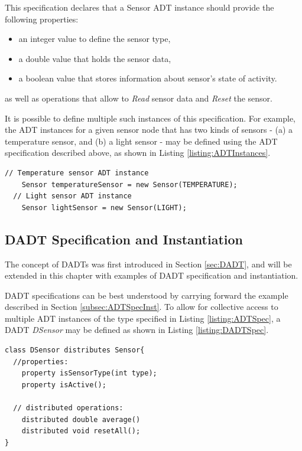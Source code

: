 This specification declares that a Sensor ADT instance should provide the following properties:
\begin{itemize}
\item an integer value to define the sensor type,
\item a double value that holds the sensor data, 
\item a boolean value that stores information about sensor's state of activity.
\end{itemize}
as well as operations that allow to \emph{Read} sensor data and \emph{Reset}
the sensor.

It is possible to define multiple such instances of this specification. For
example, the ADT instances for a given sensor node that has two kinds of sensors
- (a) a temperature sensor, and (b) a light sensor - may be defined using the ADT
specification described above, as shown in Listing \ref{listing:ADTInstances}. 
\begin{lstlisting}[frame=trbl, basewidth={0.55em, 0.6em}, captionpos=b,
basicstyle=\ttfamily\footnotesize, breaklines, caption = Sensor ADT instances, label =
listing:ADTInstances]
  // Temperature sensor ADT instance
    Sensor temperatureSensor = new Sensor(TEMPERATURE);
  // Light sensor ADT instance  
    Sensor lightSensor = new Sensor(LIGHT);
\end{lstlisting}

\subsection{DADT Specification and Instantiation} \label{subsubsec:dadtspecandinst}

The concept of DADTs was first introduced in Section \ref{sec:DADT}, and will
be extended in this chapter with examples of DADT specification and
instantiation.

DADT specifications can be best understood by carrying forward the example
described in Section \ref{subsec:ADTSpecInst}. To allow for collective access
to multiple ADT instances of the type specified in Listing
\ref{listing:ADTSpec}, a DADT \emph{DSensor} may be defined as shown in Listing
\ref{listing:DADTSpec}.   
 
\begin{lstlisting}[frame=trbl, basewidth={0.55em, 0.6em}, captionpos=b, 
basicstyle=\ttfamily\footnotesize, breaklines, caption = Data DADT 
specification (reproduced from \cite{migliavacca_DADT:2006}), label = listing:DADTSpec]
class DSensor distributes Sensor{	
  //properties:
    property isSensorType(int type);
    property isActive();

  // distributed operations:
    distributed double average()	
    distributed void resetAll();
}
\end{lstlisting} 
 
